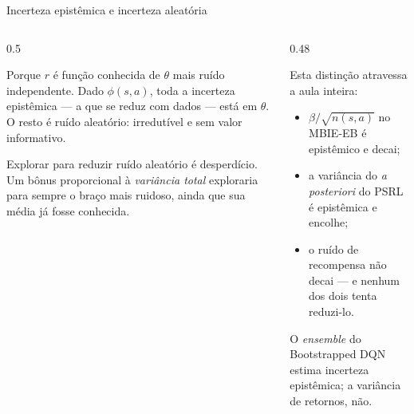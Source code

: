 \documentclass[aspectratio=169, 11pt]{beamer}
\newcommand{\feat}{\phi}
\begin{document}
\begin{frame}{Incerteza epistêmica e incerteza aleatória}
  \begin{columns}[T]
    \begin{column}{0.5\textwidth}
      \begin{respbox}
        Porque $r$ é função conhecida de $\theta$ mais ruído independente. Dado
        $\feat(s,a)$, toda a incerteza \alert{epistêmica} --- a que se reduz com dados
        --- está em $\theta$. O resto é ruído \alert{aleatório}: irredutível e sem valor
        informativo.
      \end{respbox}
      \begin{alertabox}
        Explorar para reduzir ruído aleatório é desperdício. Um bônus proporcional à
        \emph{variância total} exploraria para sempre o braço mais ruidoso, ainda que
        sua média já fosse conhecida.
      \end{alertabox}
    \end{column}
    \begin{column}{0.48\textwidth}
      \begin{ideiabox}
        Esta distinção atravessa a aula inteira:
        \begin{itemize}
          \item $\beta/\sqrt{n(s,a)}$ no MBIE-EB é epistêmico e decai;
          \item a variância do \textit{a posteriori} do PSRL é epistêmica e encolhe;
          \item o ruído de recompensa não decai --- e nenhum dos dois tenta reduzi-lo.
        \end{itemize}
      \end{ideiabox}
      {\small\color{rlCinza} O \textit{ensemble} do Bootstrapped DQN estima incerteza
      epistêmica; a variância de retornos, não.}
    \end{column}
  \end{columns}
\end{frame}
\end{document}
